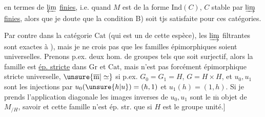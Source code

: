 en termes de $\varprojlim$ \uline{finies}, i.e. quand $M$ est de la forme $\mathrm{Ind}(C)$, $C$ stable par $\varinjlim$ \uline{finies}, alors que je doute que la condition B) soit tjs satisfaite pour ces catégories.

Par contre dans la catégorie $\mathrm{Cat}$ (qui est un  de cette espèce), les $\varinjlim$ filtrantes sont exactes à ), mais je ne crois pas que les familles épimorphiques  soient universelles. Prenons p.ex. deux hom. de groupes
tels que
soit surjectif, alors la famille  est \uline{ép. stricte} dans $\mathrm{Gr}$ et $\mathrm{Cat}$, mais n'est pas  forcément épimorphique stricte universelle, $\unsure{\overline{\mathrm{m}}|\simeq}$ si
p.ex. $G_0=G_1=H$, $G=H\times H$, et $u_0,u_1$ sont les injections
 par $u_0(\unsure{h|u})=(h,1)$ et $u_1(h)=(1,h)$. Si je prends l'application diagonale
les images inverses de $u_0,u_1$ sont le $\overline{\mathrm{m}}$ objet de $M_{/H}$, savoir
et cette  famille n'est ép. str. que si $H$ est le groupe unité.]

